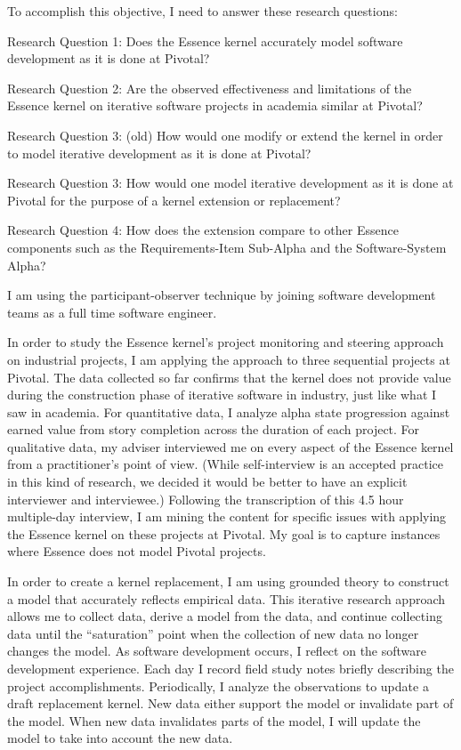\documentclass[preprint,12pt,3p]{elsarticle}
\begin{document}
To accomplish this objective, I need to answer these research questions:

Research Question 1: Does the Essence kernel accurately model software development as it is done at Pivotal? 

Research Question 2: Are the observed effectiveness and limitations of the Essence kernel on iterative software projects in academia similar at Pivotal? 

Research Question 3: (old) How would one modify or extend the kernel in order to model iterative development as it is done at Pivotal?

Research Question 3: How would one model iterative development as it is done at Pivotal for the purpose of a kernel extension or replacement?

Research Question 4: How does the extension compare to other Essence components such as the Requirements-Item Sub-Alpha and the Software-System Alpha? 

I am using the participant-observer technique by joining software development teams as a full time software engineer. 

In order to study the Essence kernel's project monitoring and steering approach on industrial projects, I am applying the approach to three sequential projects at Pivotal. The data collected so far confirms that the kernel does not provide value during the construction phase of iterative software in industry, just like what I saw in academia. For quantitative data, I analyze alpha state progression against earned value from story completion across the duration of each project. For qualitative data, my adviser interviewed me on every aspect of the Essence kernel from a practitioner's point of view. (While self-interview is an accepted practice in this kind of research, we decided it would be better to have an explicit interviewer and interviewee.) Following the transcription of this 4.5 hour multiple-day interview, I am mining the content for specific issues with applying the Essence kernel on these projects at Pivotal. My goal is to capture instances where Essence does not model Pivotal projects. 

In order to create a kernel replacement, I am using grounded theory \cite{ConstructivistGroundedTheory} to construct a model that accurately reflects empirical data. This iterative research approach allows me to collect data, derive a model from the data, and continue collecting data until the ``saturation'' point when the collection of new data no longer changes the model. As software development occurs, I reflect on the software development experience. Each day I record field study notes briefly describing the project accomplishments. Periodically, I analyze the observations to update a draft replacement kernel. New data either support the model or invalidate part of the model. When new data invalidates parts of the model, I will update the model to take into account the new data.
\end{document}
